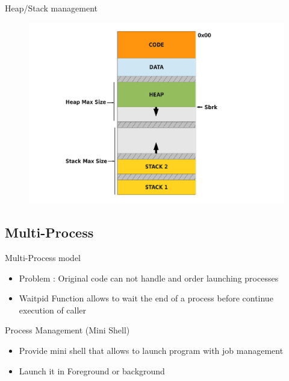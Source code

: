 \documentclass{beamer}
\begin{document}
\begin{frame}{Heap/Stack management}
    \begin{figure}[ht]
        \includegraphics[width=1\linewidth]{memoryschema.pdf}
    \end{figure}
\end{frame}

\subsection{Multi-Process}
\begin{frame}{Multi-Process model}
  \begin{itemize}
      \item Problem : Original code can not handle and
      order launching processes
      \item Waitpid Function allows to wait the end of a 
      process before continue execution of caller
  \end{itemize}
\end{frame}

\begin{frame}{Process Management (Mini Shell)}
  \begin{itemize}
      \item Provide mini shell that allows to launch 
      program with job management
      \item Launch it in Foreground or background
  \end{itemize}
\end{frame}
\end{document}
